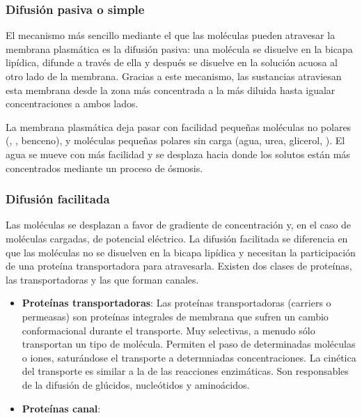 \subsubsection{Difusión pasiva o simple}
El mecanismo más sencillo mediante el que las moléculas pueden atravesar la membrana plasmática es la difusión pasiva: una molécula se disuelve en la bicapa lipídica, difunde a través de ella y después se disuelve en la solución acuosa al otro lado de la membrana. Gracias a este mecanismo, las sustancias atraviesan esta membrana desde la zona más concentrada a la más diluida hasta igualar concentraciones a ambos lados.

La membrana plasmática deja pasar con facilidad pequeñas moléculas no polares (, , benceno), y moléculas pequeñas polares sin carga (agua, urea, glicerol, ). El agua se mueve con más facilidad y se desplaza hacia donde los solutos están más concentrados mediante un proceso de ósmosis.
\subsubsection{Difusión facilitada}
Las moléculas se desplazan a favor de gradiente de concentración y, en el caso de moléculas cargadas, de potencial eléctrico. La difusión facilitada se diferencia en que las moléculas no se disuelven en la bicapa lipídica y necesitan la participación de una proteína transportadora para atravesarla. Existen dos clases de proteínas, las transportadoras y las que forman canales.
\begin{itemize}[itemsep=0pt,parsep=0pt,topsep=0pt,partopsep=0pt]
    \item \textbf{Proteínas transportadoras}: Las proteínas transportadoras (carriers o permeasas) son proteínas integrales de membrana que sufren un cambio conformacional durante el transporte. Muy selectivas, a menudo sólo transportan un tipo de molécula. Permiten el paso de determinadas moléculas o iones, saturándose el transporte a determniadas concentraciones. La cinética del transporte es similar a la de las reacciones enzimáticas. Son responsables de la difusión de glúcidos, nucleótidos y aminoácidos.
    \item\textbf{Proteínas canal}:
\end{itemize}